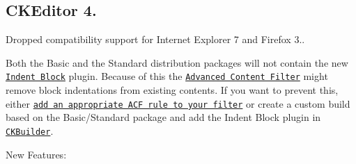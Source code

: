 {\ttfamily \subsection*{C\+K\+Editor 4.}}

{\ttfamily }

{}

{\ttfamily 
\begin{DoxyItemize}
\item Dropped compatibility support for Internet Explorer 7 and Firefox 3..
\item Both the Basic and the Standard distribution packages will not contain the new \href{http://ckeditor.com/addon/indentblock}{\tt Indent Block} plugin. Because of this the \href{http://docs.ckeditor.com/#!/guide/dev_advanced_content_filter}{\tt Advanced Content Filter} might remove block indentations from existing contents. If you want to prevent this, either \href{http://docs.ckeditor.com/#!/guide/dev_allowed_content_rules}{\tt add an appropriate A\+CF rule to your filter} or create a custom build based on the Basic/\+Standard package and add the Indent Block plugin in \href{http://ckeditor.com/builder}{\tt C\+K\+Builder}.
\end{DoxyItemize}}

{\ttfamily New Features\+:}

